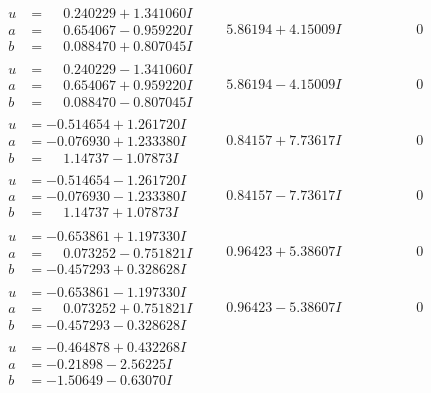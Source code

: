 \documentclass[1p]{elsarticle_modified}
\theoremstyle{definition}
\begin{document}
$$\begin{array}{c|c|c}
\begin{aligned}
u &= \phantom{-}0.240229 + 1.341060 I \\
a &= \phantom{-}0.654067 - 0.959220 I \\
b &= \phantom{-}0.088470 + 0.807045 I\end{aligned}
 & \phantom{-}5.86194 + 4.15009 I & \phantom{-0.000000 } 0 \\ \hline\begin{aligned}
u &= \phantom{-}0.240229 - 1.341060 I \\
a &= \phantom{-}0.654067 + 0.959220 I \\
b &= \phantom{-}0.088470 - 0.807045 I\end{aligned}
 & \phantom{-}5.86194 - 4.15009 I & \phantom{-0.000000 } 0 \\ \hline\begin{aligned}
u &= -0.514654 + 1.261720 I \\
a &= -0.076930 + 1.233380 I \\
b &= \phantom{-}1.14737 - 1.07873 I\end{aligned}
 & \phantom{-}0.84157 + 7.73617 I & \phantom{-0.000000 } 0 \\ \hline\begin{aligned}
u &= -0.514654 - 1.261720 I \\
a &= -0.076930 - 1.233380 I \\
b &= \phantom{-}1.14737 + 1.07873 I\end{aligned}
 & \phantom{-}0.84157 - 7.73617 I & \phantom{-0.000000 } 0 \\ \hline\begin{aligned}
u &= -0.653861 + 1.197330 I \\
a &= \phantom{-}0.073252 - 0.751821 I \\
b &= -0.457293 + 0.328628 I\end{aligned}
 & \phantom{-}0.96423 + 5.38607 I & \phantom{-0.000000 } 0 \\ \hline\begin{aligned}
u &= -0.653861 - 1.197330 I \\
a &= \phantom{-}0.073252 + 0.751821 I \\
b &= -0.457293 - 0.328628 I\end{aligned}
 & \phantom{-}0.96423 - 5.38607 I & \phantom{-0.000000 } 0 \\ \hline\begin{aligned}
u &= -0.464878 + 0.432268 I \\
a &= -0.21898 - 2.56225 I \\
b &= -1.50649 - 0.63070 I\end{aligned}

\end{array}$$
\end{document}

